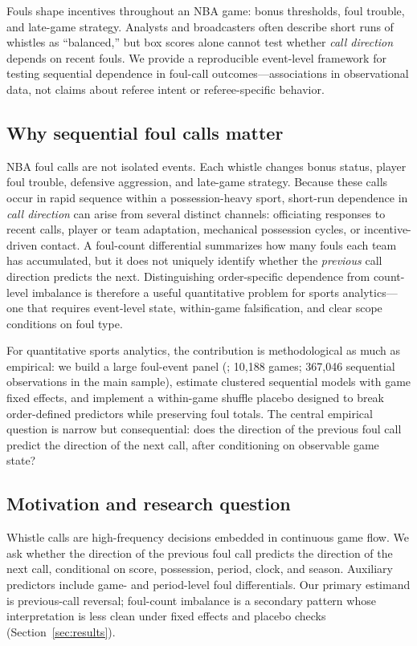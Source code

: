 Fouls shape incentives throughout an NBA game: bonus thresholds, foul trouble, and late-game strategy. Analysts and broadcasters often describe short runs of whistles as ``balanced,'' but box scores alone cannot test whether \emph{call direction} depends on recent fouls. We provide a reproducible event-level framework for testing sequential dependence in foul-call outcomes---associations in observational data, not claims about referee intent or referee-specific behavior.

\subsection{Why sequential foul calls matter}

NBA foul calls are not isolated events. Each whistle changes bonus status, player foul trouble, defensive aggression, and late-game strategy. Because these calls occur in rapid sequence within a possession-heavy sport, short-run dependence in \emph{call direction} can arise from several distinct channels: officiating responses to recent calls, player or team adaptation, mechanical possession cycles, or incentive-driven contact. A foul-count differential summarizes how many fouls each team has accumulated, but it does not uniquely identify whether the \emph{previous} call direction predicts the next. Distinguishing order-specific dependence from count-level imbalance is therefore a useful quantitative problem for sports analytics---one that requires event-level state, within-game falsification, and clear scope conditions on foul type.

For quantitative sports analytics, the contribution is methodological as much as empirical: we build a large foul-event panel (\sampleseasons{}; 10,188 games; 367,046 sequential observations in the main sample), estimate clustered sequential models with game fixed effects, and implement a within-game shuffle placebo designed to break order-defined predictors while preserving foul totals. The central empirical question is narrow but consequential: does the direction of the previous foul call predict the direction of the next call, after conditioning on observable game state?

\subsection{Motivation and research question}

Whistle calls are high-frequency decisions embedded in continuous game flow. We ask whether the direction of the previous foul call predicts the direction of the next call, conditional on score, possession, period, clock, and season. Auxiliary predictors include game- and period-level foul differentials. Our primary estimand is previous-call reversal; foul-count imbalance is a secondary pattern whose interpretation is less clean under fixed effects and placebo checks (Section~\ref{sec:results}).

